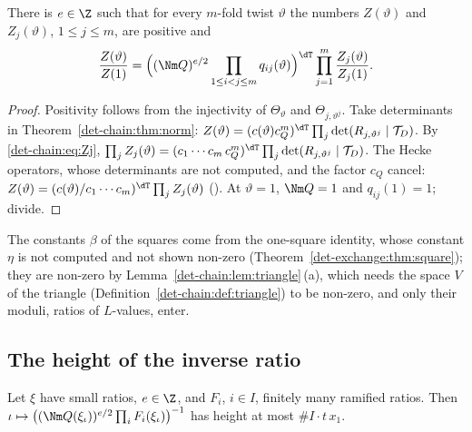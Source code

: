\begin{theorem}
\label{det-chain:thm:factor}
There is $e\in\Z$ such that for every $m$-fold twist $\vartheta$ the numbers $Z(\vartheta)$ and
$Z_j(\vartheta)$, $1\le j\le m$, are positive and
\[
  \frac{Z(\vartheta)}{Z(1)}=\Bigl((\Nm Q)^{e/2}\prod_{1\le i<j\le m}q_{ij}(\vartheta)\Bigr)^{\dT}
  \prod_{j=1}^{m}\frac{Z_j(\vartheta)}{Z_j(1)} .
\]
\end{theorem}

\begin{proof}
Positivity follows from the injectivity of $\Theta_\vartheta$ and $\Theta_{j,\vartheta^j}$. Take
determinants in Theorem~\ref{det-chain:thm:norm}:
$Z(\vartheta)=(c(\vartheta)c_Q^m)^{\dT}\prod_j\det(R_{j,\vartheta^j}\mid\mathcal{T}_D)$. By
\eqref{det-chain:eq:Zj}, $\prod_jZ_j(\vartheta)=(c_1\cdots c_m\,c_Q^m)^{\dT}
\prod_j\det(R_{j,\vartheta^j}\mid\mathcal{T}_D)$. The Hecke operators, whose determinants are not
computed, and the factor $c_Q$ cancel: $Z(\vartheta)=(c(\vartheta)/c_1\cdots c_m)^{\dT}\prod_jZ_j(\vartheta)$
(). At $\vartheta=1$,
$\Nm Q=1$ and $q_{ij}(1)=1$; divide.
\end{proof}

\begin{remark}
The constants $\beta$ of the squares come from the one-square identity,
whose constant $\eta$ is not computed and not shown non-zero (Theorem~\ref{det-exchange:thm:square});
they are non-zero by Lemma~\ref{det-chain:lem:triangle}\,(a), which needs the space $V$ of the
triangle (Definition~\ref{det-chain:def:triangle}) to be non-zero, and only their moduli, ratios of
$L$-values, enter.
\end{remark}

\subsection{The height of the inverse ratio}\label{det-chain:sec:height}

\begin{lemma}\label{det-chain:lem:ratios}
Let $\xi$ have small ratios, $e\in\Z$, and $F_i$, $i\in I$, finitely many ramified ratios. Then
$\iota\mapsto\bigl((\Nm Q(\xi_\iota))^{e/2}\prod_iF_i(\xi_\iota)\bigr)^{-1}$ has height at most
$\#I\cdot t\,x_1$.
\end{lemma}

